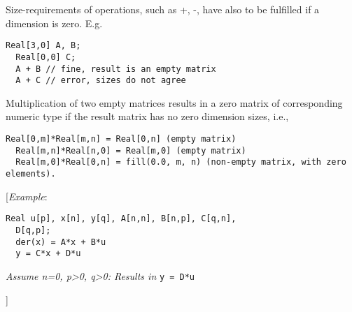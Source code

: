 Size-requirements of operations, such as +, -, have also to be fulfilled
if a dimension is zero. E.g.

\begin{lstlisting}[language=modelica]
  Real[3,0] A, B;
  Real[0,0] C;
  A + B // fine, result is an empty matrix
  A + C // error, sizes do not agree
\end{lstlisting}
Multiplication of two empty matrices results in a zero matrix of
corresponding numeric type if the result matrix has no zero dimension
sizes, i.e.,

\begin{lstlisting}[language=modelica]
  Real[0,m]*Real[m,n] = Real[0,n] (empty matrix)
  Real[m,n]*Real[n,0] = Real[m,0] (empty matrix)
  Real[m,0]*Real[0,n] = fill(0.0, m, n) (non-empty matrix, with zero elements).
\end{lstlisting}
{[}\emph{Example}:

\begin{lstlisting}[language=modelica]
  Real u[p], x[n], y[q], A[n,n], B[n,p], C[q,n],
  D[q,p];
  der(x) = A*x + B*u
  y = C*x + D*u
\end{lstlisting}
\emph{Assume n=0, p\textgreater{}0, q\textgreater{}0: Results in} \lstinline!y = D*u!

{]}
